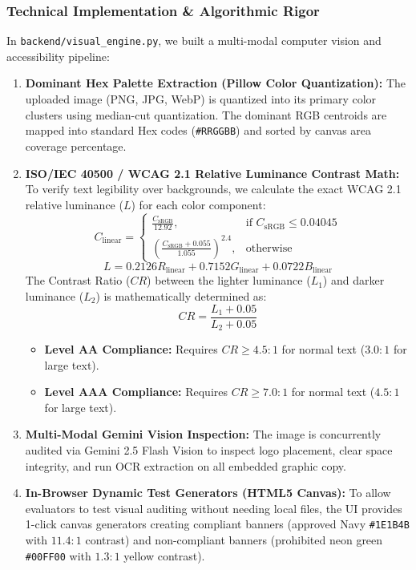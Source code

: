 \documentclass[11pt,a4paper]{article}
\begin{document}
\subsubsection{Technical Implementation \& Algorithmic Rigor}
In \texttt{backend/visual\_engine.py}, we built a multi-modal computer vision and accessibility pipeline:
\begin{enumerate}[leftmargin=1cm]
    \item \textbf{Dominant Hex Palette Extraction (Pillow Color Quantization):}
    The uploaded image (PNG, JPG, WebP) is quantized into its primary color clusters using median-cut quantization. The dominant RGB centroids are mapped into standard Hex codes (\texttt{\#RRGGBB}) and sorted by canvas area coverage percentage.
    \item \textbf{ISO/IEC 40500 / WCAG 2.1 Relative Luminance Contrast Math:}
    To verify text legibility over backgrounds, we calculate the exact WCAG 2.1 relative luminance ($L$) for each color component:
    \begin{equation}
        C_{\text{linear}} = \begin{cases}
            \frac{C_{\text{sRGB}}}{12.92}, & \text{if } C_{\text{sRGB}} \le 0.04045 \\
            \left(\frac{C_{\text{sRGB}} + 0.055}{1.055}\right)^{2.4}, & \text{otherwise}
        \end{cases}
    \end{equation}
    \begin{equation}
        L = 0.2126 R_{\text{linear}} + 0.7152 G_{\text{linear}} + 0.0722 B_{\text{linear}}
    \end{equation}
    The Contrast Ratio ($CR$) between the lighter luminance ($L_1$) and darker luminance ($L_2$) is mathematically determined as:
    \begin{equation}
        CR = \frac{L_1 + 0.05}{L_2 + 0.05}
    \end{equation}
    \begin{itemize}
        \item \textbf{Level AA Compliance:} Requires $CR \ge 4.5:1$ for normal text ($3.0:1$ for large text).
        \item \textbf{Level AAA Compliance:} Requires $CR \ge 7.0:1$ for normal text ($4.5:1$ for large text).
    \end{itemize}
    \item \textbf{Multi-Modal Gemini Vision Inspection:}
    The image is concurrently audited via Gemini 2.5 Flash Vision to inspect logo placement, clear space integrity, and run OCR extraction on all embedded graphic copy.
    \item \textbf{In-Browser Dynamic Test Generators (HTML5 Canvas):}
    To allow evaluators to test visual auditing without needing local files, the UI provides 1-click canvas generators creating compliant banners (approved Navy \texttt{\#1E1B4B} with $11.4:1$ contrast) and non-compliant banners (prohibited neon green \texttt{\#00FF00} with $1.3:1$ yellow contrast).
\end{enumerate}
\end{document}
